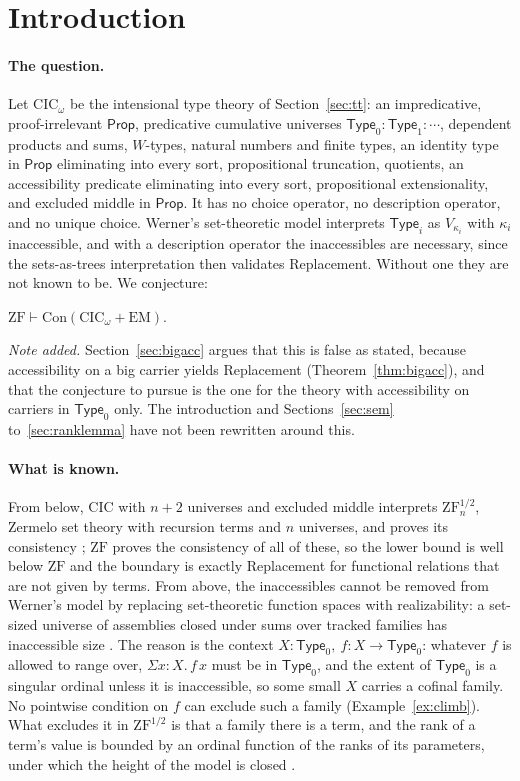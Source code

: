 \documentclass[10pt]{article}
\newcommand{\Prop}{\mathsf{Prop}}
\newcommand{\Type}{\mathsf{Type}}
\newcommand{\CIC}{\mathrm{CIC}}
\newcommand{\ZF}{\mathrm{ZF}}
\newcommand{\ZFh}{\mathrm{ZF}^{1/2}}
\newcommand{\EM}{\mathrm{EM}}
\newcommand{\Con}{\mathrm{Con}}
\begin{document}
\section{Introduction}

\paragraph{The question.}
Let $\CIC_\omega$ be the intensional type theory of
Section~\ref{sec:tt}: an impredicative, proof-irrelevant $\Prop$,
predicative cumulative universes $\Type_0:\Type_1:\cdots$, dependent
products and sums, $W$-types, natural numbers and finite types, an
identity type in $\Prop$ eliminating into every sort, propositional
truncation, quotients, an accessibility predicate eliminating into every
sort, propositional extensionality, and excluded middle in $\Prop$. It
has no choice operator, no description operator, and no unique choice.
Werner's set-theoretic model \cite{werner97} interprets $\Type_i$ as
$V_{\kappa_i}$ with $\kappa_i$ inaccessible, and with a description
operator the inaccessibles are necessary, since the sets-as-trees
interpretation then validates Replacement. Without one they are not
known to be. We conjecture:

\begin{conjecture}[main]\label{conj:main}
$\ZF\vdash\Con(\CIC_\omega+\EM)$.
\end{conjecture}

\emph{Note added.} Section~\ref{sec:bigacc} argues that this is false
as stated, because accessibility on a big carrier yields Replacement
(Theorem~\ref{thm:bigacc}), and that the conjecture to pursue is the one
for the theory with accessibility on carriers in $\Type_0$ only. The
introduction and Sections~\ref{sec:sem} to~\ref{sec:ranklemma} have not
been rewritten around this.

\paragraph{What is known.}
From below, $\CIC$ with $n+2$ universes and excluded middle interprets
$\ZFh_n$, Zermelo set theory with recursion terms and $n$ universes, and
proves its consistency \cite{paper2}; $\ZF$ proves the consistency of
all of these, so the lower bound is well below $\ZF$ and the boundary
is exactly Replacement for functional relations that are not given by
terms. From above, the inaccessibles cannot be removed from Werner's
model by replacing set-theoretic function spaces with realizability:
a set-sized universe of assemblies closed under sums over tracked
families has inaccessible size \cite[Prop.~4.4]{paper1}. The reason is
the context $X{:}\Type_0,\ f{:}X\to\Type_0$: whatever $f$ is allowed to
range over, $\Sigma x{:}X.\,f\,x$ must be in $\Type_0$, and the extent of
$\Type_0$ is a singular ordinal unless it is inaccessible, so some
small $X$ carries a cofinal family. No pointwise condition on $f$ can
exclude such a family (Example~\ref{ex:climb}). What excludes it in
$\ZFh$ is that a family there is a term, and the rank of a term's value
is bounded by an ordinal function of the ranks of its parameters, under
which the height of the model is closed \cite[\S3--4]{paper2}.
\end{document}

